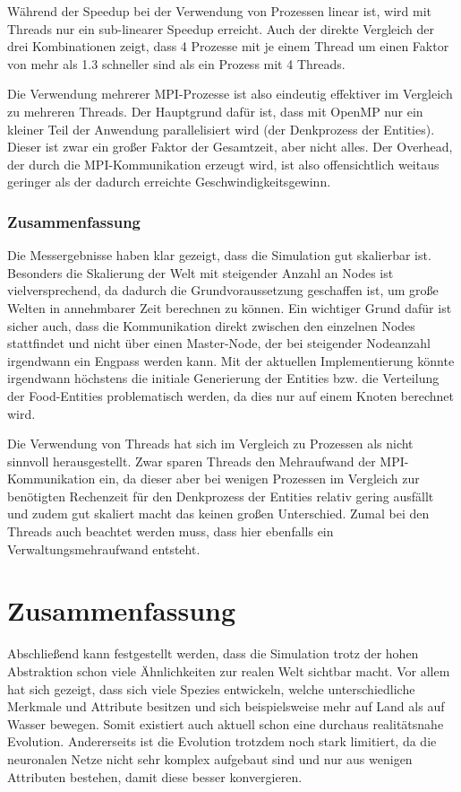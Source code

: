 \documentclass[course=erap]{aspdoc}
\begin{document}
Während der Speedup bei der Verwendung von Prozessen linear ist, wird mit Threads nur ein sub-linearer Speedup erreicht. Auch der direkte Vergleich der drei Kombinationen zeigt, dass 4 Prozesse mit je einem Thread um einen Faktor von mehr als 1.3 schneller sind als ein Prozess mit 4 Threads.

Die Verwendung mehrerer MPI-Prozesse ist also eindeutig effektiver im Vergleich zu mehreren Threads. Der Hauptgrund dafür ist, dass mit OpenMP nur ein kleiner Teil der Anwendung parallelisiert wird (der Denkprozess der Entities). Dieser ist zwar ein großer Faktor der Gesamtzeit, aber nicht alles. Der Overhead, der durch die MPI-Kommunikation erzeugt wird, ist also offensichtlich weitaus geringer als der dadurch erreichte Geschwindigkeitsgewinn.

\subsubsection{Zusammenfassung}
Die Messergebnisse haben klar gezeigt, dass die Simulation gut skalierbar ist. Besonders die Skalierung der Welt mit steigender Anzahl an Nodes ist vielversprechend, da dadurch die Grundvoraussetzung geschaffen ist, um große Welten in annehmbarer Zeit berechnen zu können. Ein wichtiger Grund dafür ist sicher auch, dass die Kommunikation direkt zwischen den einzelnen Nodes stattfindet und nicht über einen Master-Node, der bei steigender Nodeanzahl irgendwann ein Engpass werden kann. Mit der aktuellen Implementierung könnte irgendwann höchstens die initiale Generierung der Entities bzw. die Verteilung der Food-Entities problematisch werden, da dies nur auf einem Knoten berechnet wird.

Die Verwendung von Threads hat sich im Vergleich zu Prozessen als nicht sinnvoll herausgestellt. Zwar sparen Threads den Mehraufwand der MPI-Kommunikation ein, da dieser aber bei wenigen Prozessen im Vergleich zur benötigten Rechenzeit für den Denkprozess der Entities relativ gering ausfällt und zudem gut skaliert macht das keinen großen Unterschied. Zumal bei den Threads auch beachtet werden muss, dass hier ebenfalls ein Verwaltungsmehraufwand entsteht.

\section{Zusammenfassung}
Abschließend kann festgestellt werden, dass die Simulation trotz der hohen Abstraktion schon viele Ähnlichkeiten zur realen Welt sichtbar macht. Vor allem hat sich gezeigt, dass sich viele Spezies entwickeln, welche unterschiedliche Merkmale und Attribute besitzen und sich beispielsweise mehr auf Land als auf Wasser bewegen. Somit existiert auch aktuell schon eine durchaus realitätsnahe Evolution. Andererseits ist die Evolution trotzdem noch stark limitiert, da die neuronalen Netze nicht sehr komplex aufgebaut sind und nur aus wenigen Attributen bestehen, damit diese besser konvergieren.
\end{document}

